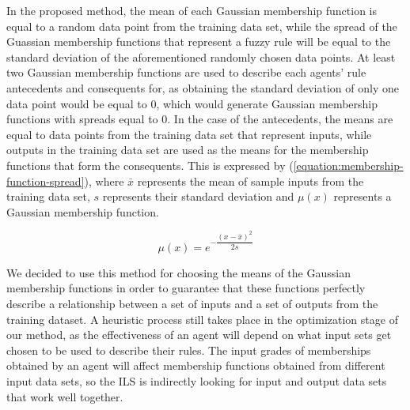 \documentclass{ieeeaccess}
\begin{document}
In the proposed method, the mean of each Gaussian membership function is equal to a random data point from the training data set,
while the spread of the Guassian membership functions that represent a fuzzy rule will be equal to the standard deviation of the aforementioned
randomly chosen data points. At least two Gaussian membership functions are used to describe each agents' rule antecedents and
consequents for, as obtaining the standard deviation of only one data point would be equal to 0, which would generate Gaussian membership functions with spreads equal to 0.
In the case of the antecedents, the means are equal to data points from the training data set that represent inputs, while outputs in the
training data set are used as the means for the membership functions that form the consequents. This is expressed by (\ref{equation:membership-function-spread}), where $\bar{x}$ represents the mean of sample inputs from the training data set, $s$ represents
their standard deviation and $\mu(x)$ represents a Gaussian membership function.

\begin{equation}
  \label{equation:membership-function-spread}
  \mu(x) = e^{-\dfrac{(x - \bar{x})^{2}}{2 s}}
\end{equation}

We decided to use this method for choosing the means of the Gaussian
membership functions in order to guarantee that these functions
perfectly describe a relationship between a set of inputs and a set of
outputs from the training dataset. A heuristic process still takes
place in the optimization stage of our method, as the effectiveness of
an agent will depend on what input sets get chosen to be used to
describe their rules. The input grades of memberships obtained by an
agent will affect membership functions obtained from different input
data sets, so the ILS is indirectly looking for input and output data
sets that work well together.

\end{document}
